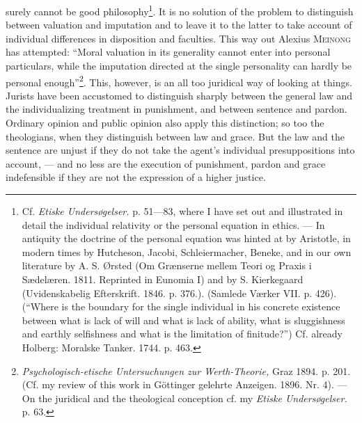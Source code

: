 \documentclass[12pt,a4paper,openany]{book}
\newcommand{\opage}[1]{\marginnote{\footnotesize\textit{[#1]}}}
\begin{document}
surely cannot be good philosophy\footnote[1]{Cf. \textit{Etiske Undersøgelser.} p. 51---83, where I
have set out and illustrated in detail the individual relativity or the personal equation in ethics.
--- In antiquity the doctrine of the personal equation was hinted at by Aristotle, in modern times by
Hutcheson, Jacobi, Schleiermacher, Beneke, and in our own literature by A. S. Ørsted (Om Grænserne
mellem Teori og Praxis i Sædelæren. 1811. Reprinted in Eunomia I) and by S. Kierkegaard
(Uvidenskabelig Efterskrift. 1846. p. 376.). (Samlede Værker VII. p. 426). (``Where is the boundary for
the single individual in his concrete existence between what is lack of will and what is lack of
ability, what is sluggishness and earthly selfishness and what is the limitation of finitude?'') Cf.
already Holberg: Moralske Tanker. 1744. p. 463.}. It is no solution of the
\opage{92}problem to distinguish between valuation and imputation and to leave it to the latter to take account
of individual differences in disposition and faculties. This way out Alexius \textsc{Meinong} has
attempted: ``Moral valuation in its generality cannot enter into personal particulars, while the
imputation directed at the single personality can hardly be personal enough''\footnote[1]{\textit{Psychologisch-etische
Untersuchungen zur Werth-Theorie,} Graz 1894. p. 201. (Cf. my review of this work in Göttinger gelehrte
Anzeigen. 1896. Nr. 4). --- On the juridical and the theological conception cf. my \textit{Etiske
Undersøgelser.} p. 63.}. This, however, is an all too juridical way of looking at things. Jurists have
been accustomed to distinguish sharply between the general law and the individualizing treatment in
punishment, and between sentence and pardon. Ordinary opinion and public opinion also apply this
distinction; so too the theologians, when they distinguish between law and grace. But the law and the
sentence are unjust if they do not take the agent's individual presuppositions into account, --- and no
less are the execution of punishment, pardon and grace indefensible if they are not the expression of a
higher justice.
\end{document}
